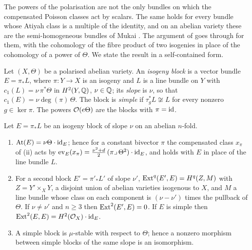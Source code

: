 The powers of the polarisation are not the only bundles on which the
compensated Poisson classes act by scalars. The same holds for every bundle
whose Atiyah class is a multiple of the identity, and on an abelian variety
these are the semi-homogeneous bundles of Mukai \cite{Muk78}. The argument of
 goes through for them, with the cohomology of the fibre
product of two isogenies in place of the cohomology of a power of $\Theta$.
We state the result in a self-contained form.

\begin{definition}\label{def:block}
Let $(X,\Theta)$ be a polarised abelian variety. An \emph{isogeny block} is a
vector bundle $E=\pi_{*}L$, where $\pi\colon Y\to X$ is an isogeny and $L$ is
a line bundle on $Y$ with $c_{1}(L)=\nu\,\pi^{*}\Theta$ in $H^{2}(Y,\mathbb{Q})$,
$\nu\in\mathbb{Q}$; its \emph{slope} is $\nu$, so that $c_{1}(E)=\nu\deg(\pi)\,\Theta$.
The block is \emph{simple} if $\tau_{g}^{*}L\not\cong L$ for every nonzero
$g\in\ker\pi$. The powers $\mathcal{O}(e\Theta)$ are the blocks with $\pi=\operatorname{id}$.
\end{definition}

\begin{lemma}\label{lem:blocks}
Let $E=\pi_{*}L$ be an isogeny block of slope $\nu$ on an abelian $n$-fold.
\begin{enumerate}[label=\textup{(\roman*)},nosep]
\item $\mathrm{At}(E)=\nu\Theta\cdot\operatorname{id}_{E}$; hence for a constant bivector
  $\pi$ the compensated class $x_{\pi}$ of (ii) acts by
  $\operatorname{ev}_{E}(x_{\pi})=\tfrac{\nu^{2}+d}{2}\,(\pi\lrcorner\,\Theta^{2})\cdot\operatorname{id}_{E}$,
  and  holds with $E$ in place of the line bundle $L$.
\item For a second block $E'=\pi'_{*}L'$ of slope $\nu'$,
  $\operatorname{Ext}^{q}(E',E)=H^{q}(Z,M)$ with $Z=Y'\times_{X}Y$, a disjoint union of
  abelian varieties isogenous to $X$, and $M$ a line bundle whose class on
  each component is $(\nu-\nu')$ times the pullback of $\Theta$. If
  $\nu\ne\nu'$ and $n\ge3$ then $\operatorname{Ext}^{2}(E',E)=0$. If $E$ is simple then
  $\operatorname{Ext}^{2}(E,E)=H^{2}(\mathcal{O}_{X})\cdot\operatorname{id}_{E}$.
\item A simple block is $\mu$-stable with respect to $\Theta$; hence a
  nonzero morphism between simple blocks of the same slope is an
  isomorphism.
\end{enumerate}
\end{lemma}

